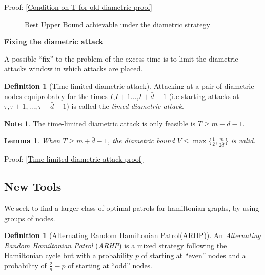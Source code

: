 \documentclass[a4paper,10pt]{article}
\newtheorem{lemma}[theorem]{Lemma}
\theoremstyle{definition}
\newtheorem{definition}[theorem]{Definition}
\theoremstyle{definition}
\theoremstyle{remark}
\theoremstyle{definition}
\newtheorem*{note}{Note}
\begin{document}
Proof: \ref{Condition on T for old diametric proof}

\begin{figure}
\resizebox{0.95\linewidth}{!}{
}
\caption{Best Upper Bound achievable under the diametric strategy}
\end{figure}

\textbf{Fixing the diametric attack}

A possible ``fix'' to the problem of the excess time is to limit the diametric attacks window in which attacks are placed.

\begin{definition}[Time-limited diametric attack]
Attacking at a pair of diametric nodes equiprobably for the times $I$,$I+1$...,$I+\bar{d}-1$ (i.e starting attacks at $\tau,\tau+1,...,\tau+\bar{d}-1$) is called the \textit{timed diametric attack}.
\end{definition}

\begin{note}
The time-limited diametric attack is only feasible is $T \geq m+\bar{d}-1$.
\end{note}

\begin{lemma}
When $T \geq m+ \bar{d}-1$, the diametric bound $V \leq \max\{\frac{1}{2},\frac{m}{2\bar{d}}\}$ is valid.
\end{lemma}

Proof: \ref{Time-limited diametric attack proof}
\subsection{New Tools}
We seek to find a larger class of optimal patrols for hamiltonian graphs, by using groups of nodes.

\begin{definition}[Alternating Random Hamiltonian Patrol(ARHP)]
An \textit{Alternating Random Hamiltonian Patrol} (\textit{ARHP}) is a mixed strategy following the Hamiltonian cycle but with a probability $p$ of starting at ``even'' nodes and a probability of $\frac{2}{n}-p$ of starting at ``odd'' nodes.
\end{definition}
\end{document}
